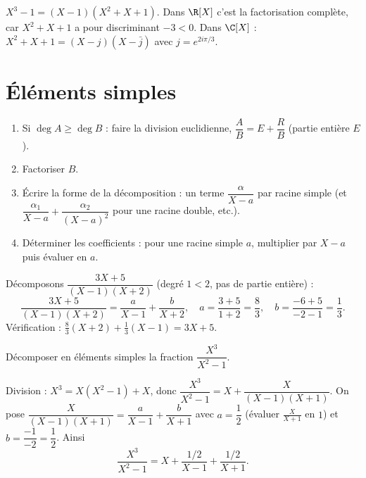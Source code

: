 \begin{exemple}
$X^3-1=(X-1)(X^2+X+1)$. Dans $\R[X]$ c'est la factorisation complète, car $X^2+X+1$ a pour discriminant $-3<0$. Dans $\C[X]$ : $X^2+X+1=(X-j)(X-\bar j)$ avec $j=e^{2i\pi/3}$.
\end{exemple}

\section{Éléments simples}

\begin{methode}
\begin{enumerate}[label=\textbf{Étape \arabic*.}]
  \item Si $\deg A\ge\deg B$ : faire la division euclidienne, $\dfrac AB=E+\dfrac RB$ (partie entière $E$).
  \item Factoriser $B$.
  \item Écrire la forme de la décomposition : un terme $\dfrac{\alpha}{X-a}$ par racine simple (et $\dfrac{\alpha_1}{X-a}+\dfrac{\alpha_2}{(X-a)^2}$ pour une racine double, etc.).
  \item Déterminer les coefficients : pour une racine simple $a$, multiplier par $X-a$ puis évaluer en $a$.
\end{enumerate}
\end{methode}

\begin{exemple}
Décomposons $\dfrac{3X+5}{(X-1)(X+2)}$ (degré $1<2$, pas de partie entière) :
\[
  \frac{3X+5}{(X-1)(X+2)}=\frac{a}{X-1}+\frac{b}{X+2},\quad
  a=\frac{3+5}{1+2}=\frac83,\quad b=\frac{-6+5}{-2-1}=\frac13 .
\]
Vérification : $\frac83(X+2)+\frac13(X-1)=3X+5$.
\end{exemple}

\begin{exercice}[Application]
Décomposer en éléments simples la fraction $\dfrac{X^3}{X^2-1}$.
\begin{correction}
Division : $X^3=X(X^2-1)+X$, donc $\dfrac{X^3}{X^2-1}=X+\dfrac{X}{(X-1)(X+1)}$. On pose $\dfrac{X}{(X-1)(X+1)}=\dfrac{a}{X-1}+\dfrac{b}{X+1}$ avec $a=\dfrac{1}{2}$ (évaluer $\frac{X}{X+1}$ en $1$) et $b=\dfrac{-1}{-2}=\dfrac12$. Ainsi
\[
  \frac{X^3}{X^2-1}=X+\frac{1/2}{X-1}+\frac{1/2}{X+1}.
\]
\end{correction}
\end{exercice}
